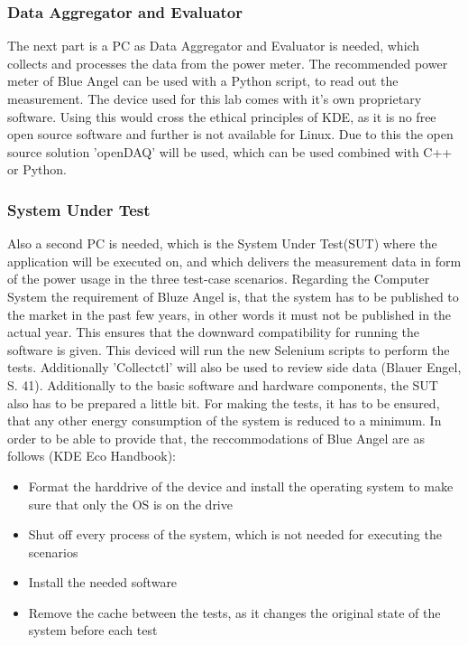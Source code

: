         \subsubsection{Data Aggregator and Evaluator}
        The next part is a PC as Data Aggregator and Evaluator is needed, which collects and processes the data from the power meter. The recommended power meter of Blue Angel can be used with a Python script, to read out the measurement. The device used for this lab comes with it's own proprietary software. Using this would cross the ethical principles of KDE, as it is no free open source software and further is not available for Linux. Due to this the open source solution 'openDAQ' will be used, which can be used combined with C++ or Python.
        \subsubsection{System Under Test}
        Also a second PC is needed, which is the System Under Test(SUT) where the application will be executed on, and which delivers the measurement data in form of the power usage in the three test-case scenarios.
        Regarding the Computer System the requirement of Bluze Angel is, that the system has to be published to the market in the past few years, in other words it must not be published in the actual year. This ensures that the downward compatibility for running the software is given. This deviced will run the new Selenium scripts to perform the tests. Additionally 'Collectctl' will also be used to review side data (Blauer Engel, S. 41).
        Additionally to the basic software and hardware components, the SUT also has to be prepared a little bit. For making the tests, it has to be ensured, that any other energy consumption of the system is reduced to a minimum. In order to be able to provide that, the reccommodations of Blue Angel are as follows (KDE Eco Handbook):
        \begin{itemize}
         \item Format the harddrive of the device and install the operating system to make sure that only the OS is on the drive
         \item Shut off every process of the system, which is not needed for executing the scenarios
         \item Install the needed software
         \item Remove the cache between the tests, as it changes the original state of the system before each test
        \end{itemize}


